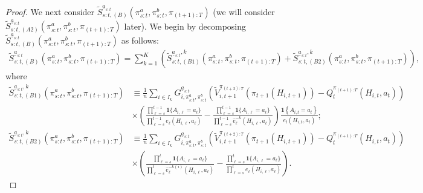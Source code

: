 \begin{proof}
We next consider $\widetilde{S}_{s:t,(B)}^{\underline{a}_{s:t}}(\pi_{s:t}^{a},\pi_{s:t}^{b},\pi_{(t+1):T})$ (we will consider $\widetilde{S}_{s:t,(A2)}^{\underline{a}_{s:t}}(\pi_{s:t}^{a},\pi_{s:t}^{b},\pi_{(t+1):T})$ later). We begin by decomposing $\widetilde{S}_{s:t,(B)}^{\underline{a}_{s:t}}(\pi_{s:t}^{a},\pi_{s:t}^{b},\pi_{(t+1):T})$ as follows:
\begin{align*}
    \widetilde{S}_{s:t,(B)}^{\underline{a}_{s:t}}(\pi_{s:t}^{a},\pi_{s:t}^{b},\pi_{(t+1):T})=\sum_{k=1}^{K}\left(\widetilde{S}_{s:t,(B1)}^{\underline{a}_{s:t},k}(\pi_{s:t}^{a},\pi_{s:t}^{b},\pi_{(t+1):T})+\widetilde{S}_{s:t,(B2)}^{\underline{a}_{s:t},k}(\pi_{s:t}^{a},\pi_{s:t}^{b},\pi_{(t+1):T})\right),
\end{align*}
where
\begin{align*}
    \widetilde{S}_{s:t,(B1)}^{\underline{a}_{s:t},k}(\pi_{s:t}^{a},\pi_{s:t}^{b},\pi_{(t+1):T})& \equiv \frac{1}{n}\sum_{i\in I_k}G_{i,\pi_{s:t}^{a},\pi_{s:t}^{b}}^{\underline{a}_{s:t}}\left(\widetilde{V}_{i,t+1}^{\pi_{(t+2):T}}(\pi_{t+1}(H_{i,t+1}))-Q_{t}^{\pi_{(t+1):T}}\left(H_{i,t},a_{t}\right)\right)\\
    &\times \left(\frac{\prod_{\ell=s}^{t-1}\mathbf{1}\{A_{i,\ell}=a_{\ell}\}}{\prod_{\ell=s}^{t-1}e_{\ell}(H_{i,\ell},a_{\ell})}-\frac{\prod_{\ell=s}^{t-1}\mathbf{1}\{A_{i,\ell}=a_{\ell}\}}{\prod_{\ell=s}^{t-1}\hat{e}_{\ell}^{-k}(H_{i,\ell},a_{\ell})}\right)\frac{\mathbf{1}\left\{ A_{i,t}=a_{t}\right\} }{e_{t}\left(H_{i,t},a_{t}\right)};\\
    \widetilde{S}_{s:t,(B2)}^{\underline{a}_{s:t},k}(\pi_{s:t}^{a},\pi_{s:t}^{b},\pi_{(t+1):T})& \equiv \frac{1}{n}\sum_{i \in I_k}G_{i,\pi_{s:t}^{a},\pi_{s:t}^{b}}^{\underline{a}_{s:t}}\left(\widetilde{V}_{i,t+1}^{\pi_{(t+2):T}}(\pi_{t+1}(H_{i,t+1}))-Q_{t}^{\pi_{(t+1):T}}\left(H_{i,t},a_{t}\right)\right)\\
    &\times \left(\frac{\prod_{\ell=s}^{t}\mathbf{1}\{A_{i,\ell}=a_{\ell}\}}{\prod_{\ell=s}^{t}\hat{e}_{\ell}^{-k(i)}(H_{i,\ell},a_{\ell})}-\frac{\prod_{\ell=s}^{t}\mathbf{1}\{A_{i,\ell}=a_{\ell}\}}{\prod_{\ell=s}^{t}e_{\ell}(H_{i,\ell},a_{\ell})}\right).
\end{align*}


\end{proof}
